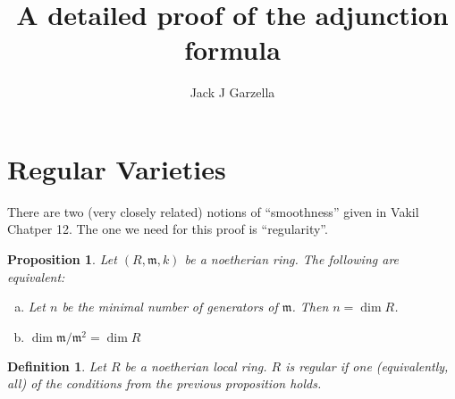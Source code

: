 \documentclass[a4paper]{article}
\title{A detailed proof of the adjunction formula}
\author{Jack J Garzella}
\newtheorem{prop}[thm]{Proposition}
\newtheorem{defn}[thm]{Definition}
\begin{document}
\maketitle

\section{Regular Varieties}

There are two (very closely related)
notions of ``smoothness'' given in Vakil Chatper 12.
The one we need for this proof is ``regularity''.

\begin{prop}
	Let \((R,\mathfrak{m},k)\) be a noetherian ring. 
	The following are equivalent:
	\begin{enumerate}[(a)]
		\item Let \(n\) be the minimal number of generators of
			\(\mathfrak{m}\).
			Then \(n = \dim R\).
		\item \(\dim \mathfrak{m} / \mathfrak{m}^{2}  = \dim R\)
	\end{enumerate}
\end{prop}


\begin{defn}
	Let \(R\) be a noetherian local ring.
	\(R\) is \textit{regular} if one (equivalently, all)
	of the conditions from the previous proposition holds.
\end{defn}

\end{document}
